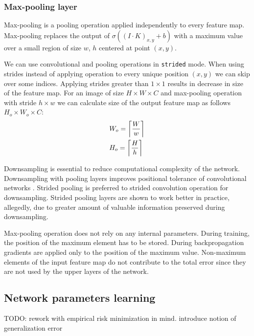 \subsubsection{Max-pooling layer}

Max-pooling is a pooling operation applied independently to every feature map.
Max-pooling replaces the output of $\sigma((I \cdot K)_{x, y}+b)$ with a maximum value over a small region of size $w$, $h$ centered at point $(x,y)$.

We can use convolutional and pooling operations in \texttt{strided} mode. When using strides instead of applying operation to every unique position $(x, y)$ we can skip over some indices. Applying strides greater than $1 \times 1$ results in decrease in size of the feature map. For an image of size $H \times W \times C$ and max-pooling operation with stride $h \times w$ we can calculate size of the output feature map as follows $H_o \times W_o \times C $:
\begin{equation*}
  \begin{aligned}
  & W_o = \ceil[\bigg]{\frac{W}{w}} \\
  & H_o = \ceil[\bigg]{\frac{H}{h}} \\
\end{aligned}
\end{equation*}

Downsampling is essential to reduce computational complexity of the network.
Downsampling with pooling layers improves positional tolerance of convolutional networks \cite{Scherer2010}.
Strided pooling is preferred to strided convolution operation for downsampling. Strided pooling layers are shown to work better in practice, allegedly, due to greater amount of valuable information preserved during downsampling.

Max-pooling operation does not rely on any internal parameters. During training, the position of the maximum element has to be stored. During backpropagation gradients are applied only to the position of the maximum value. Non-maximum elements of the input feature map do not contribute to the total error since they are not used by the upper layers of the network.

\subsection{Network parameters learning}
\label{ch:opt}

TODO: rework with empirical risk minimization in mind. introduce notion of generalization error

